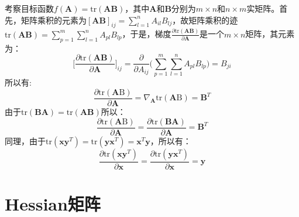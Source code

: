 \documentclass[10pt,a4paper,UTF8]{article}
\begin{document}
\begin{tikzinstance}


考察目标函数\(f(\mathbf{A}) = \mathrm{tr}(\mathbf{A}\mathbf{B})\)，其中\(\mathbf{A}\)和\(\mathbf{B}\)分别为\(m\times n\)和\(n\times m\)实矩阵。首先，矩阵乘积的元素为\([\mathbf{A}\mathbf{B}]_{ij} = \sum_{l=1}^{n}A_{il}B_{lj}\)，故矩阵乘积的迹\(\mathrm{tr}(\mathbf{A}\mathbf{B}) = \sum_{p=1}^{m}\sum_{l=1}^{n}A_{pl}B_{lp}\)，于是，梯度\(\frac{\partial \mathrm{tr}(\mathbf{A}\mathbf{B})}{\partial \mathbf{A}}\)是一个\(m\times n\)矩阵，其元素为：
\begin{equation}
\label{eq:38}
\bigg[ \frac{\partial \mathrm{tr}(\mathbf{A}\mathbf{B})}{\partial \mathbf{A}} \bigg]_{ij} = \frac{\partial }{\partial A_{ij}} \bigg(\sum_{p=1}^{m}\sum_{l=1}^{n}A_{pl}B_{lp} \bigg) = B_{ji}
\end{equation}
所以有:
\begin{equation}
\label{eq:39}
\frac{\partial \mathrm{tr}(\mathbf{A}\mathrm{B})}{\partial \mathbf{A}} = \nabla_{\mathbf{A}} \mathrm{tr}(\mathbf{A}\mathrm{B}) = \mathbf{B}^{T}
\end{equation}
由于\(\mathrm{tr}(\mathbf{B}\mathbf{A}) = \mathrm{tr}(\mathbf{A}\mathbf{B})\)所以：
\begin{equation}
\label{eq:40}
\frac{ \partial \mathrm{tr}(\mathbf{A}\mathrm{B}) }{\partial \mathbf{A}} = \frac{\partial \mathrm{tr}(\mathbf{B}\mathbf{A})}{\partial \mathbf{A}} = \mathbf{B}^{T}
\end{equation}
同理，由于\(\mathrm{tr}(\mathbf{x}\mathbf{y}^{T}) = \mathrm{tr}(\mathbf{y}\mathbf{x}^{T}) = \mathbf{x}^{T}\mathbf{y}\)，所以有：
\begin{equation}
\label{eq:41}
\frac{\partial \mathrm{tr}(\mathbf{x}\mathbf{y}^{T})}{\partial  \mathbf{x}} = \frac{\partial \mathrm{tr}(\mathbf{y}\mathbf{x}^{T})}{\partial  \mathbf{x}} = \mathbf{y}
\end{equation}
\end{tikzinstance}

\section{Hessian矩阵}
\label{sec:org004c744}
\end{document}
